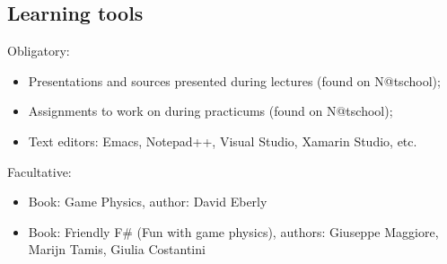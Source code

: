	\subsection{Learning tools}
		Obligatory:
		\begin{itemize}
			\item Presentations and sources presented during lectures (found on N@tschool);
			\item Assignments to work on during practicums (found on N@tschool);
			\item Text editors: Emacs, Notepad++, Visual Studio, Xamarin Studio, etc.
		\end{itemize}
		Facultative:
		\begin{itemize}
			\item Book: Game Physics, author: David Eberly
			\item Book: Friendly F\# (Fun with game physics), authors: Giuseppe Maggiore, Marijn Tamis, Giulia Costantini
		\end{itemize}
